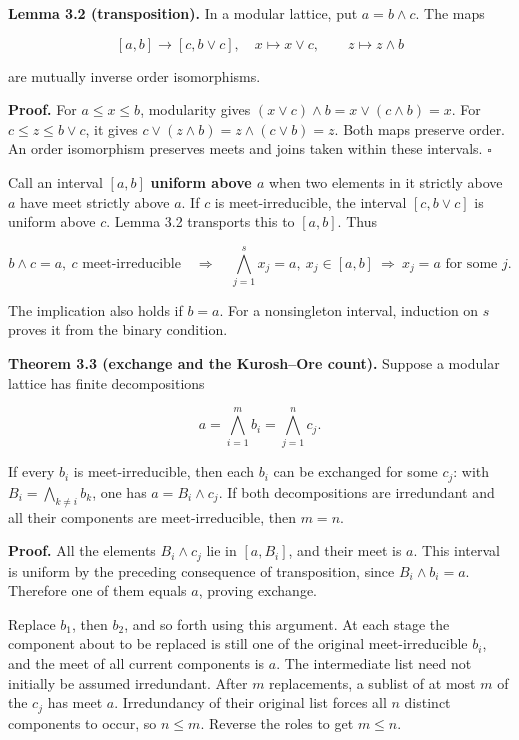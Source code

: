 \documentclass[
]{article}
\begin{document}
\textbf{Lemma 3.2 (transposition).} In a modular lattice, put
\(a=b\wedge c\). The maps

\[
[a,b]\longrightarrow[c,b\vee c],\quad x\longmapsto x\vee c,
\qquad z\longmapsto z\wedge b
\]

are mutually inverse order isomorphisms.

\textbf{Proof.} For \(a\le x\le b\), modularity gives
\((x\vee c)\wedge b=x\vee(c\wedge b)=x\). For \(c\le z\le b\vee c\), it
gives \(c\vee(z\wedge b)=z\wedge(c\vee b)=z\). Both maps preserve order.
An order isomorphism preserves meets and joins taken within these
intervals. \(\square\)

Call an interval \([a,b]\) \textbf{uniform above \(a\)} when two
elements in it strictly above \(a\) have meet strictly above \(a\). If
\(c\) is meet-irreducible, the interval \([c,b\vee c]\) is uniform above
\(c\). Lemma 3.2 transports this to \([a,b]\). Thus

\[
b\wedge c=a,\ c\text{ meet-irreducible}
\quad\Longrightarrow\quad
\bigwedge_{j=1}^s x_j=a,\ x_j\in[a,b]
\ \Longrightarrow\ x_j=a\text{ for some }j.
\]

The implication also holds if \(b=a\). For a nonsingleton interval,
induction on \(s\) proves it from the binary condition.

\textbf{Theorem 3.3 (exchange and the Kurosh--Ore count).} Suppose a
modular lattice has finite decompositions

\[
a=\bigwedge_{i=1}^m b_i=\bigwedge_{j=1}^n c_j.
\]

If every \(b_i\) is meet-irreducible, then each \(b_i\) can be exchanged
for some \(c_j\): with \(B_i=\bigwedge_{k\ne i}b_k\), one has
\(a=B_i\wedge c_j\). If both decompositions are irredundant and all
their components are meet-irreducible, then \(m=n\).

\textbf{Proof.} All the elements \(B_i\wedge c_j\) lie in \([a,B_i]\),
and their meet is \(a\). This interval is uniform by the preceding
consequence of transposition, since \(B_i\wedge b_i=a\). Therefore one
of them equals \(a\), proving exchange.

Replace \(b_1\), then \(b_2\), and so forth using this argument. At each
stage the component about to be replaced is still one of the original
meet-irreducible \(b_i\), and the meet of all current components is
\(a\). The intermediate list need not initially be assumed irredundant.
After \(m\) replacements, a sublist of at most \(m\) of the \(c_j\) has
meet \(a\). Irredundancy of their original list forces all \(n\)
distinct components to occur, so \(n\le m\). Reverse the roles to get
\(m\le n\).
\end{document}

